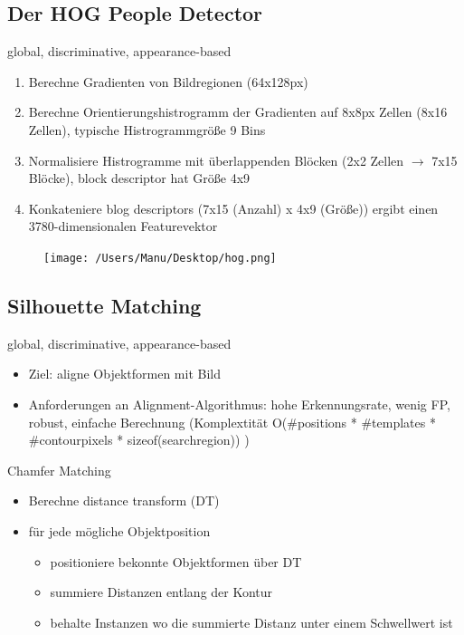 \documentclass[paper=a4, fontsize=11pt]{scrartcl} %
\numberwithin{equation}{section} %
\numberwithin{figure}{section} %
\numberwithin{table}{section} %
\begin{document}
\subsection{Der HOG People Detector}

global, discriminative, appearance-based

\begin{minipage}{0.55\textwidth}
\begin{enumerate}
\item Berechne Gradienten von Bildregionen (64x128px)
\item Berechne Orientierungshistrogramm der Gradienten auf 8x8px Zellen (8x16 Zellen), typische Histrogrammgröße 9 Bins
\item Normalisiere Histrogramme mit überlappenden Blöcken (2x2 Zellen $\rightarrow$ 7x15 Blöcke), block descriptor hat Größe 4x9
\item Konkateniere blog descriptors (7x15 (Anzahl) x 4x9 (Größe)) ergibt einen 3780-dimensionalen Featurevektor
\end{enumerate}
\end{minipage} \hfill
\begin{minipage}{0.4\textwidth}
\begin{figure}[H]
\texttt{[image: /Users/Manu/Desktop/hog.png]}
\end{figure}
\end{minipage}

\subsection{Silhouette Matching}

global, discriminative, appearance-based

\begin{itemize}
\item Ziel: aligne Objektformen mit Bild
\item Anforderungen an Alignment-Algorithmus: hohe Erkennungsrate, wenig FP, robust, einfache Berechnung (Komplextität O(\#positions * \#templates * \#contourpixels * sizeof(searchregion))
)
\end{itemize}

Chamfer Matching
\begin{itemize}
\item Berechne distance transform (DT)
\item für jede mögliche Objektposition
\begin{itemize}
\item positioniere bekonnte Objektformen über DT
\item summiere Distanzen entlang der Kontur
\item behalte Instanzen wo die summierte Distanz unter einem Schwellwert ist
\end{itemize}
\end{itemize}
\end{document}
